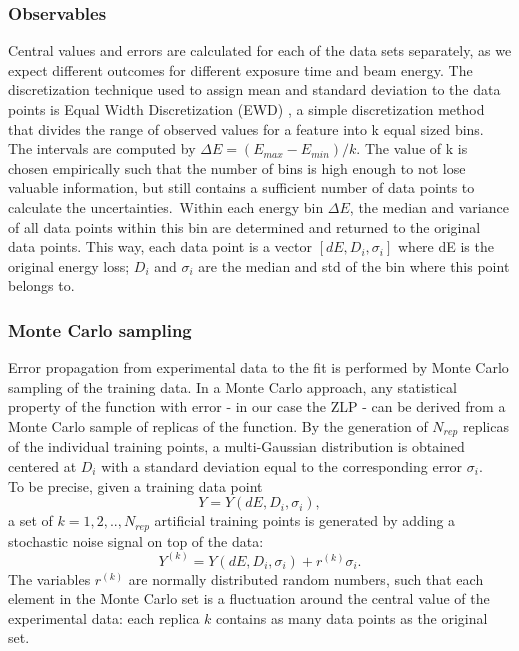 \subsubsection*{Observables}
Central values and errors are calculated for each of the data sets separately, as we expect different outcomes for different exposure time and beam energy. The discretization technique used to assign mean and standard deviation to the data points is Equal Width Discretization (EWD) \cite{Dash:2011}, a simple discretization method that divides the range of observed values for a feature into k equal sized bins. The intervals are computed by 
$\Delta E = (E_{max} - E_{min}) / k$. The value of k is chosen empirically such that the number of bins is high enough to not lose valuable information, but still contains a sufficient number of data points to calculate the uncertainties.\
 Within each energy bin $\Delta E$, the median and variance of all data points within this bin are determined and returned to the original data points. This way, each data point is a vector $[dE, D_i, \sigma_i]$ where dE is the original energy loss; $D_i$ and $\sigma_i$ are the median and std of the bin where this point belongs to. 

\subsubsection*{Monte Carlo sampling}
Error propagation from experimental data to the fit is performed by Monte Carlo sampling of the training data. In a Monte Carlo approach, any statistical property of the function with error - in our case the ZLP - can be derived from a Monte Carlo sample of replicas of the function. By the generation of $N_{rep}$ replicas of the individual training points, a multi-Gaussian distribution is obtained centered at $D_i$ with a standard deviation equal to the corresponding error $\sigma_i$. \\
To be precise, given a training data point
\begin{equation}
    Y = Y(dE, D_i,\sigma_i), 
\end{equation} a set of $k= 1,2,..,N_{rep}$ artificial training points is generated by adding a stochastic noise signal on top of the data: 
\begin{equation}
    Y^{(k)} = Y(dE, D_i,\sigma_i) + r^{(k)}\sigma_i.
\end{equation}
The variables $r^{(k)}$ are normally distributed random numbers, such that each element in the Monte Carlo set is a fluctuation around the central value of the experimental data: each replica $k$ contains as many data points as the original set. \\

